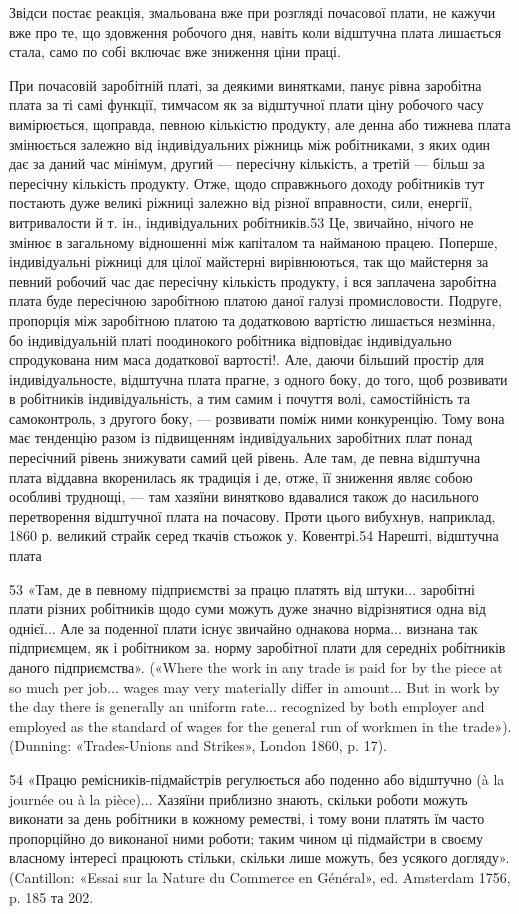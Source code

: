 Звідси постає реакція, змальована вже при розгляді почасової
плати, не кажучи вже про те, що здовження робочого дня, навіть
коли відштучна плата лишається стала, само по собі включає
вже зниження ціни праці.

При почасовій заробітній платі, за деякими винятками, панує
рівна заробітна плата за ті самі функції, тимчасом як за відштучної
плати ціну робочого часу вимірюється, щоправда, певною
кількістю продукту, але денна або тижнева плата змінюється
залежно від індивідуальних ріжниць між робітниками, з яких
один дає за даний час мінімум, другий — пересічну кількість,
а третій — більш за пересічну кількість продукту. Отже, щодо
справжнього доходу робітників тут постають дуже великі ріжниці
залежно від різної вправности, сили, енергії, витривалости
й т. ін., індивідуальних робітників.53 Це, звичайно, нічого не
змінює в загальному відношенні між капіталом та найманою
працею. Поперше, індивідуальні ріжниці для цілої майстерні
вирівнюються, так що майстерня за певний робочий час дає пересічну
кількість продукту, і вся заплачена заробітна плата буде
пересічною заробітною платою даної галузі промисловости. Подруге,
пропорція між заробітною платою та додатковою вартістю
лишається незмінна, бо індивідуальній платі поодинокого робітника
відповідає індивідуально спродукована ним маса додаткової
вартості!. Але, даючи більший простір для індивідуальносте,
відштучна плата прагне, з одного боку, до того, щоб розвивати в
робітників індивідуальність, а тим самим і почуття волі, самостійність
та самоконтроль, з другого боку, — розвивати поміж
ними конкуренцію. Тому вона має тенденцію разом із підвищенням
індивідуальних заробітних плат понад пересічний рівень
знижувати самий цей рівень. Але там, де певна відштучна
плата віддавна вкоренилась як традиція і де, отже, її зниження
являє собою особливі труднощі, — там хазяїни винятково вдавалися
також до насильного перетворення відштучної плата на почасову.
Проти цього вибухнув, наприклад, 1860 р. великий страйк
серед ткачів стьожок у. Ковентрі.54 Нарешті, відштучна плата

53 «Там, де в певному підприємстві за працю платять від штуки...
заробітні плати різних робітників щодо суми можуть дуже значно відрізнятися
одна від однієї... Але за поденної плати існує звичайно однакова
норма... визнана так підприємцем, як і робітником за. норму заробітної
плати для середніх робітників даного підприємства». («Where the
work in any trade is paid for by the piece at so much per job... wages may
very materially differ in amount... But in work by the day there is generally
an uniform rate... recognized by both employer and employed as the
standard of wages for the general run of workmen in the trade»). (Dunning:
«Trades-Unions and Strikes», London 1860, p. 17).

54 «Працю ремісників-підмайстрів регулюється або поденно або
відштучно (à la journée ou à la pièce)... Хазяїни приблизно знають,
скільки роботи можуть виконати за день робітники в кожному реместві,
і тому вони платять їм часто пропорційно до виконаної ними роботи;
таким чином ці підмайстри в своєму власному інтересі працюють стільки,
скільки лише можуть, без усякого догляду». (Cantillon: «Essai sur la
Nature du Commerce en Général», ed. Amsterdam 1756, p. 185 та 202.
